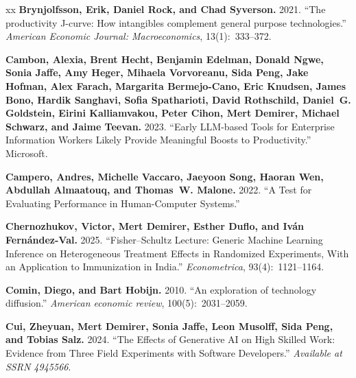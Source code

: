 \documentclass{article}
\begin{document}
\begin{thebibliography}{xx}
{\bf Brynjolfsson, Erik, Daniel Rock, and Chad Syverson.} 2021. ``The productivity J-curve: How intangibles complement general purpose technologies.'' {\em American Economic Journal: Macroeconomics}, 13(1):~333--372.

{\bf Cambon, Alexia, Brent Hecht, Benjamin Edelman, Donald Ngwe, Sonia Jaffe, Amy Heger, Mihaela Vorvoreanu, Sida Peng, Jake Hofman, Alex Farach, Margarita Bermejo-Cano, Eric Knudsen, James Bono, Hardik Sanghavi, Sofia Spatharioti, David Rothschild, Daniel~G. Goldstein, Eirini Kalliamvakou, Peter Cihon, Mert Demirer, Michael Schwarz, and Jaime Teevan.} 2023. ``Early LLM-based Tools for Enterprise Information Workers Likely Provide Meaningful Boosts to Productivity.'' Microsoft.

{\bf Campero, Andres, Michelle Vaccaro, Jaeyoon Song, Haoran Wen, Abdullah Almaatouq, and Thomas~W. Malone.} 2022. ``A Test for Evaluating Performance in Human-Computer Systems.''

{\bf Chernozhukov, Victor, Mert Demirer, Esther Duflo, and Iván Fernández-Val.} 2025. ``Fisher–Schultz Lecture: Generic Machine Learning Inference on Heterogeneous Treatment Effects in Randomized Experiments, With an Application to Immunization in India.'' {\em Econometrica}, 93(4):~1121--1164.

{\bf Comin, Diego, and Bart Hobijn.} 2010. ``An exploration of technology diffusion.'' {\em American economic review}, 100(5):~2031--2059.

{\bf Cui, Zheyuan, Mert Demirer, Sonia Jaffe, Leon Musolff, Sida Peng, and Tobias Salz.} 2024. ``The Effects of Generative AI on High Skilled Work: Evidence from Three Field Experiments with Software Developers.'' {\em Available at SSRN 4945566}.


\end{thebibliography}
\end{document}
